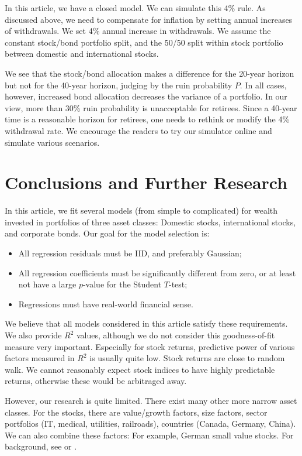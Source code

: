 \documentclass[12pt]{amsart}
\begin{document}
In this article, we have a closed model. We can simulate this 4\% rule. As discussed above, we need to compensate for inflation by setting annual increases of withdrawals. We set 4\% annual increase in withdrawals. We assume the constant stock/bond portfolio split, and the 50/50 split within stock portfolio between domestic and international stocks. 

We see that the stock/bond allocation makes a difference for the 20-year horizon but not for the 40-year horizon, judging by the ruin probability $P$. In all cases, however, increased bond allocation decreases the variance of a portfolio. In our view, more than 30\% ruin probability is unacceptable for retirees. Since a 40-year time is a reasonable horizon for retirees, one needs to rethink or modify the 4\% withdrawal rate. We encourage the readers to try our simulator online and simulate various scenarios. 

\section{Conclusions and Further Research}

In this article, we fit several models (from simple to complicated) for wealth invested in portfolios of three asset classes: Domestic stocks, international stocks, and corporate bonds. Our goal for the model selection is:

\begin{itemize}
\item All regression residuals must be IID, and preferably Gaussian;
\item All regression coefficients must be significantly different from zero, or at least not have a large $p$-value for the Student $T$-test;
\item Regressions must have real-world financial sense.
\end{itemize}

We believe that all models considered in this article satisfy these requirements. We also provide $R^2$ values, although we do not consider this goodness-of-fit measure very important. Especially for stock returns, predictive power of various factors measured in $R^2$ is usually quite low. Stock returns are close to random walk. We cannot reasonably expect stock indices to have highly predictable returns, otherwise these would be arbitraged away. 

However, our research is quite limited. There exist many other more narrow asset classes. For the stocks, there are value/growth factors, size factors, sector portfolios (IT, medical, utilities, railroads), countries (Canada, Germany, China). We can also combine these factors: For example, German small value stocks. For background, see \cite[Chapter 6]{Textbook} or \cite[Chapter 7, Section 3]{Ang}. 
\end{document}
